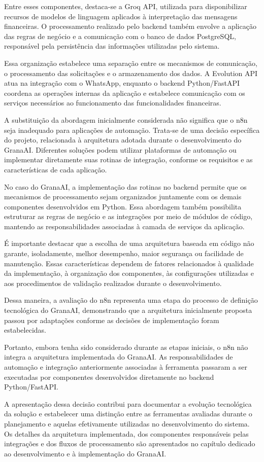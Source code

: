 Entre esses componentes, destaca-se a Groq API, utilizada para disponibilizar recursos de modelos de linguagem aplicados à interpretação das mensagens financeiras. O processamento realizado pelo backend também envolve a aplicação das regras de negócio e a comunicação com o banco de dados PostgreSQL, responsável pela persistência das informações utilizadas pelo sistema.

Essa organização estabelece uma separação entre os mecanismos de comunicação, o processamento das solicitações e o armazenamento dos dados. A Evolution API atua na integração com o WhatsApp, enquanto o backend Python/FastAPI coordena as operações internas da aplicação e estabelece comunicação com os serviços necessários ao funcionamento das funcionalidades financeiras.

A substituição da abordagem inicialmente considerada não significa que o n8n seja inadequado para aplicações de automação. Trata-se de uma decisão específica do projeto, relacionada à arquitetura adotada durante o desenvolvimento do GranaAI. Diferentes soluções podem utilizar plataformas de automação ou implementar diretamente suas rotinas de integração, conforme os requisitos e as características de cada aplicação.

No caso do GranaAI, a implementação das rotinas no backend permite que os mecanismos de processamento sejam organizados juntamente com os demais componentes desenvolvidos em Python. Essa abordagem também possibilita estruturar as regras de negócio e as integrações por meio de módulos de código, mantendo as responsabilidades associadas à camada de serviços da aplicação.

É importante destacar que a escolha de uma arquitetura baseada em código não garante, isoladamente, melhor desempenho, maior segurança ou facilidade de manutenção. Essas características dependem de fatores relacionados à qualidade da implementação, à organização dos componentes, às configurações utilizadas e aos procedimentos de validação realizados durante o desenvolvimento.

Dessa maneira, a avaliação do n8n representa uma etapa do processo de definição tecnológica do GranaAI, demonstrando que a arquitetura inicialmente proposta passou por adaptações conforme as decisões de implementação foram estabelecidas.

Portanto, embora tenha sido considerado durante as etapas iniciais, o n8n não integra a arquitetura implementada do GranaAI. As responsabilidades de automação e integração anteriormente associadas à ferramenta passaram a ser executadas por componentes desenvolvidos diretamente no backend Python/FastAPI.

A apresentação dessa decisão contribui para documentar a evolução tecnológica da solução e estabelecer uma distinção entre as ferramentas avaliadas durante o planejamento e aquelas efetivamente utilizadas no desenvolvimento do sistema. Os detalhes da arquitetura implementada, dos componentes responsáveis pelas integrações e dos fluxos de processamento são apresentados no capítulo dedicado ao desenvolvimento e à implementação do GranaAI.
